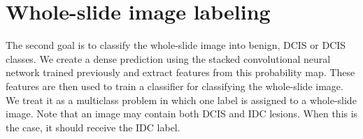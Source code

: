 \documentclass[journal]{IEEEtran}
\begin{document}
%




\section{Whole-slide image labeling}
The second goal is to classify the whole-slide image into benign, DCIS or DCIS classes. We create a dense prediction using the stacked convolutional neural network trained previously and extract features from this probability map. These features are then used to train a classifier for classifying the whole-slide image. We treat it as a multiclass problem in which one label is assigned to a whole-slide image. Note that an image may contain both DCIS and IDC lesions. When this is the case, it should receive the IDC label.
\end{document}

